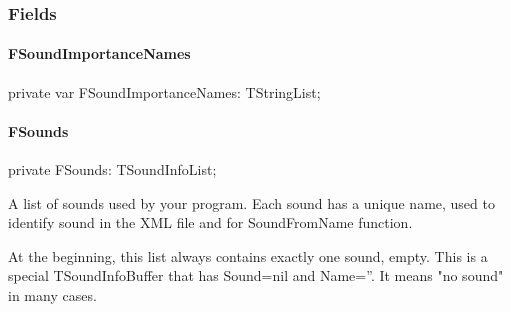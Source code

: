 \documentclass{report}
\begin{document}
\subsubsection*{\large{\textbf{Fields}}\normalsize\hspace{1ex}\hfill}
\paragraph*{FSoundImportanceNames}\hspace*{\fill}

\begin{list}{}{
\setlength{\itemindent}{0cm}
\setlength{\listparindent}{0cm}
\setlength{\leftmargin}{\evensidemargin}
\addtolength{\leftmargin}{\tmplength}
\settowidth{\labelsep}{X}
\addtolength{\leftmargin}{\labelsep}
\setlength{\labelwidth}{\tmplength}
}
\begin{flushleft}
\item[\textbf{Declaration}\hfill]
\begin{ttfamily}
private var FSoundImportanceNames: TStringList;\end{ttfamily}


\end{flushleft}
\end{list}
\paragraph*{FSounds}\hspace*{\fill}

\begin{list}{}{
\setlength{\itemindent}{0cm}
\setlength{\listparindent}{0cm}
\setlength{\leftmargin}{\evensidemargin}
\addtolength{\leftmargin}{\tmplength}
\settowidth{\labelsep}{X}
\addtolength{\leftmargin}{\labelsep}
\setlength{\labelwidth}{\tmplength}
}
\begin{flushleft}
\item[\textbf{Declaration}\hfill]
\begin{ttfamily}
private FSounds: TSoundInfoList;\end{ttfamily}


\end{flushleft}
\par
\item[\textbf{Description}]
A list of sounds used by your program. Each sound has a unique name, used to identify sound in the XML file and for SoundFromName function.

At the beginning, this list always contains exactly one sound, empty. This is a special TSoundInfoBuffer that has Sound=nil and Name=''. It means "no sound" in many cases.

\end{list}
\end{document}
